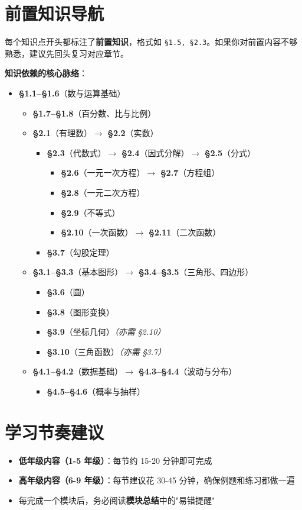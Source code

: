 \section*{前置知识导航}


每个知识点开头都标注了\textbf{前置知识}，格式如 \texttt{§1.5, §2.3}。如果你对前置内容不够熟悉，建议先回头复习对应章节。

\textbf{知识依赖的核心脉络}：

\begin{itemize}[leftmargin=*, label={}]
  \item \textbf{§1.1--§1.6}（数与运算基础）
  \begin{itemize}[label=$\to$]
    \item \textbf{§1.7--§1.8}（百分数、比与比例）
    \item \textbf{§2.1}（有理数）$\to$ \textbf{§2.2}（实数）
    \begin{itemize}[label=$\to$]
      \item \textbf{§2.3}（代数式）$\to$ \textbf{§2.4}（因式分解）$\to$ \textbf{§2.5}（分式）
      \begin{itemize}[label=$\to$]
        \item \textbf{§2.6}（一元一次方程）$\to$ \textbf{§2.7}（方程组）
        \item \textbf{§2.8}（一元二次方程）
        \item \textbf{§2.9}（不等式）
        \item \textbf{§2.10}（一次函数）$\to$ \textbf{§2.11}（二次函数）
      \end{itemize}
      \item \textbf{§3.7}（勾股定理）
    \end{itemize}
    \item \textbf{§3.1--§3.3}（基本图形）$\to$ \textbf{§3.4--§3.5}（三角形、四边形）
    \begin{itemize}[label=$\to$]
      \item \textbf{§3.6}（圆）
      \item \textbf{§3.8}（图形变换）
      \item \textbf{§3.9}（坐标几何）\quad\textit{（亦需 §2.10）}
      \item \textbf{§3.10}（三角函数）\quad\textit{（亦需 §3.7）}
    \end{itemize}
    \item \textbf{§4.1--§4.2}（数据基础）$\to$ \textbf{§4.3--§4.4}（波动与分布）
    \begin{itemize}[label=$\to$]
      \item \textbf{§4.5--§4.6}（概率与抽样）
    \end{itemize}
  \end{itemize}
\end{itemize}

\section*{学习节奏建议}


\begin{itemize}
  \item \textbf{低年级内容（1-5 年级）}：每节约 15-20 分钟即可完成
  \item \textbf{高年级内容（6-9 年级）}：每节建议花 30-45 分钟，确保例题和练习都做一遍
  \item 每完成一个模块后，务必阅读\textbf{模块总结}中的"易错提醒"
\end{itemize}

